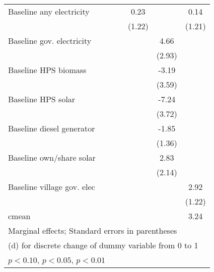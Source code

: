 \begin{table}[htbp]
\begin{tabular*}{1\hsize}{@{\hskip\tabcolsep\extracolsep\fill}l*{6}{c}}
Baseline any electricity&                  &                  &                  &     0.23         &                  &     0.14         \\
                &                  &                  &                  &   (1.22)         &                  &   (1.21)         \\
Baseline gov. electricity&                  &                  &                  &                  &     4.66         &                  \\
                &                  &                  &                  &                  &   (2.93)         &                  \\
Baseline HPS biomass&                  &                  &                  &                  &    -3.19         &                  \\
                &                  &                  &                  &                  &   (3.59)         &                  \\
Baseline HPS solar&                  &                  &                  &                  &    -7.24\sym{*}  &                  \\
                &                  &                  &                  &                  &   (3.72)         &                  \\
Baseline diesel generator&                  &                  &                  &                  &    -1.85         &                  \\
                &                  &                  &                  &                  &   (1.36)         &                  \\
Baseline own/share solar&                  &                  &                  &                  &     2.83         &                  \\
                &                  &                  &                  &                  &   (2.14)         &                  \\
Baseline village gov. elec&                  &                  &                  &                  &                  &     2.92\sym{**} \\
                &                  &                  &                  &                  &                  &   (1.22)         \\
\midrule
cmean           &                  &                  &                  &                  &                  &     3.24         \\
\bottomrule
\multicolumn{7}{l}{\footnotesize Marginal effects; Standard errors in parentheses}\\
\multicolumn{7}{l}{\footnotesize  (d) for discrete change of dummy variable from 0 to 1}\\
\multicolumn{7}{l}{\footnotesize \sym{*} \(p<0.10\), \sym{**} \(p<0.05\), \sym{***} \(p<0.01\)}\\
\end{tabular*}
\end{table}
